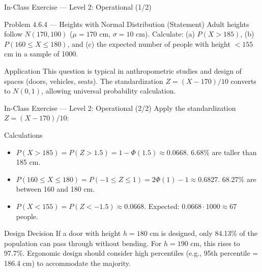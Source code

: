 \documentclass[aspectratio=169,xcolor={dvipsnames,table}]{beamer}
\begin{document}
\begin{frame}{In-Class Exercise --- Level 2: Operational (1/2)}
	\vspace{-0.1cm}
	\begin{block}{Problem 4.6.4 --- Heights with Normal Distribution (Statement)}
		Adult heights follow $N(170, 100)$ ($\mu = 170$ cm, $\sigma = 10$ cm). Calculate: (a) $P(X > 185)$, (b) $P(160 \le X \le 180)$, and (c) the expected number of people with height $< 155$ cm in a sample of 1000.
	\end{block}
	\vspace{0.15cm}
	\pause
	\begin{alertblock}{Application}
		\scriptsize
		This question is typical in anthropometric studies and design of spaces (doors, vehicles, seats). The standardization $Z = (X - 170)/10$ converts to $N(0, 1)$, allowing universal probability calculation.
	\end{alertblock}
\end{frame}

\begin{frame}{In-Class Exercise --- Level 2: Operational (2/2)}
	\vspace{-0.05cm}
	\scriptsize
	Apply the standardization $Z = (X - 170)/10$: \pause
	\begin{block}{Calculations}
		\begin{itemize}\itemsep=0.05cm
			\item $P(X > 185) = P(Z > 1.5) = 1 - \Phi(1.5) \approx 0.0668$. 6.68\% are taller than 185 cm.
			\item $P(160 \le X \le 180) = P(-1 \le Z \le 1) = 2\Phi(1) - 1 \approx 0.6827$. 68.27\% are between 160 and 180 cm.
			\item $P(X < 155) = P(Z < -1.5) \approx 0.0668$. Expected: $0.0668 \cdot 1000 \approx 67$ people.
		\end{itemize}
	\end{block}
	\vspace{0.05cm}
	\pause
	\begin{alertblock}{Design Decision}
		\scriptsize
		If a door with height $h = 180$ cm is designed, only 84.13\% of the population can pass through without bending. For $h = 190$ cm, this rises to 97.7\%. Ergonomic design should consider high percentiles (e.g., 95th percentile = 186.4 cm) to accommodate the majority.
	\end{alertblock}
\end{frame}
\end{document}
